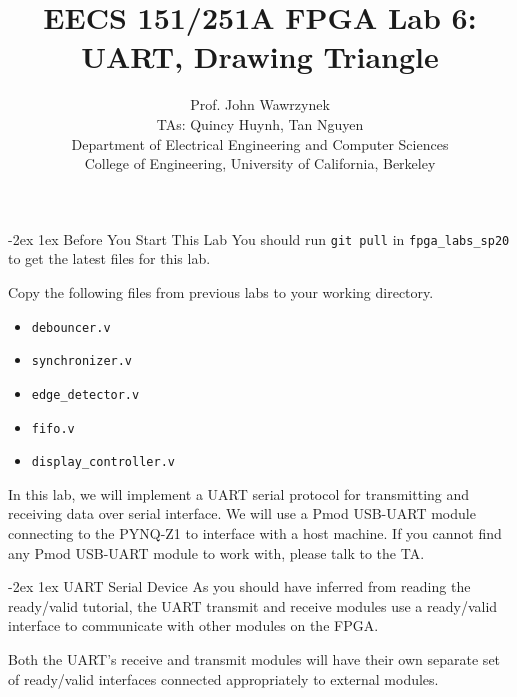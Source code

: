 \documentclass[11pt]{article}
\makeatletter
\renewcommand{\section}
{\@startsection {section}{1}{0pt}
 {-2ex}
 {1ex}
 {\bfseries\Large}}
\makeatother
\begin{document}
\def\PYZsq{\textquotesingle}
\title{\vspace{-0.4in}\Large \bf EECS 151/251A FPGA Lab 6:\\UART, Drawing Triangle\vspace{-0.1in}}

\author{Prof. John Wawrzynek \\
TAs: Quincy Huynh, Tan Nguyen \\ Department of Electrical Engineering and Computer Sciences\\
College of Engineering, University of California, Berkeley}
\date{}
\maketitle

\section{Before You Start This Lab}
You should run \verb|git pull| in \verb|fpga_labs_sp20| to get the latest files for this lab.

Copy the following files from previous labs to your working directory.
\begin{itemize}
  \item \verb|debouncer.v|
  \item \verb|synchronizer.v|
  \item \verb|edge_detector.v|
  \item \verb|fifo.v|
  \item \verb|display_controller.v|
\end{itemize}

In this lab, we will implement a UART serial protocol for transmitting and receiving data over serial interface. We will use a Pmod USB-UART module connecting to the PYNQ-Z1 to interface with a host machine. If you cannot find any Pmod USB-UART module to work with, please talk to the TA.

\section{UART Serial Device}
As you should have inferred from reading the ready/valid tutorial, the UART transmit and receive modules use a ready/valid interface to communicate with other modules on the FPGA.

Both the UART’s receive and transmit modules will have their own separate set of ready/valid interfaces connected appropriately to external modules.
\end{document}
